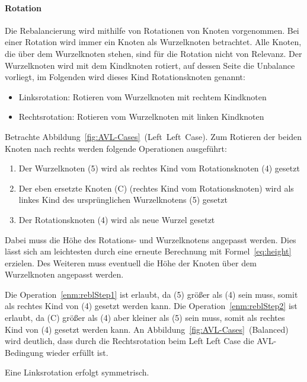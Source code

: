\paragraph*{Rotation}\label{par:rotating}

Die Rebalancierung wird mithilfe von Rotationen von Knoten vorgenommen.
Bei einer Rotation wird immer ein Knoten als Wurzelknoten betrachtet.
Alle Knoten, die über dem Wurzelknoten stehen, sind für die Rotation nicht von
Relevanz.
Der Wurzelknoten wird mit dem Kindknoten rotiert, auf dessen Seite die
Unbalance vorliegt, im Folgenden wird dieses Kind Rotationsknoten genannt:
\begin{itemize}
    \item Linksrotation: Rotieren vom Wurzelknoten mit rechtem Kindknoten
    \item Rechtsrotation: Rotieren vom Wurzelknoten mit linken Kindknoten
\end{itemize}
Betrachte Abbildung~\ref{fig:AVL-Cases}~(Left~Left~Case).
Zum Rotieren der beiden Knoten nach rechts werden folgende Operationen ausgeführt:
\begin{enumerate}
    \item Der Wurzelknoten (5) wird als rechtes Kind vom Rotationsknoten (4)
    gesetzt\label{enm:reblStep1}
    \item Der eben ersetzte Knoten (C) (rechtes Kind vom Rotationsknoten) wird als linkes Kind
    des ursprünglichen Wurzelknotens (5) gesetzt\label{enm:reblStep2}
    \item Der Rotationsknoten (4) wird als neue Wurzel gesetzt\label{enm:reblStep3}
\end{enumerate}
Dabei muss die Höhe des Rotations- und Wurzelknotens angepasst werden.
Dies lässt sich am leichtesten durch eine erneute Berechnung mit Formel~\ref{eq:height} erzielen.
Des Weiteren muss eventuell die Höhe der Knoten über dem Wurzelknoten angepasst werden.

Die Operation~\ref{enm:reblStep1} ist erlaubt, da (5) größer als (4) sein muss, somit als rechtes
Kind von (4) gesetzt werden kann.
Die Operation~\ref{enm:reblStep2} ist erlaubt, da (C) größer als (4) aber kleiner als (5) sein
muss, somit als rechtes Kind von (4) gesetzt werden kann.
An Abbildung~\ref{fig:AVL-Cases}~(Balanced) wird deutlich, dass durch die
Rechtsrotation beim Left Left Case die AVL-Bedingung wieder erfüllt ist.

Eine Linksrotation erfolgt symmetrisch.

